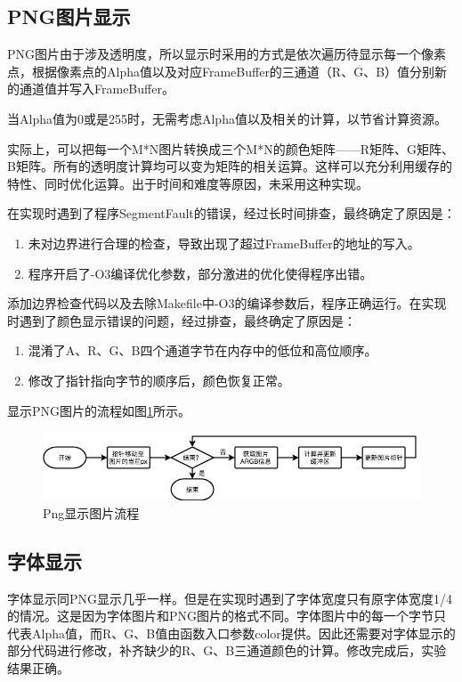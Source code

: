\documentclass{report}
\begin{document}
\subsection{PNG图片显示}
\par PNG图片由于涉及透明度，所以显示时采用的方式是依次遍历待显示每一个像素点，根据像素点的Alpha值以及对应FrameBuffer的三通道（R、G、B）值分别新的通道值并写入FrameBuffer。
\par 当Alpha值为0或是255时，无需考虑Alpha值以及相关的计算，以节省计算资源。
\par 实际上，可以把每一个M*N图片转换成三个M*N的颜色矩阵——R矩阵、G矩阵、B矩阵。所有的透明度计算均可以变为矩阵的相关运算。这样可以充分利用缓存的特性、同时优化运算。出于时间和难度等原因，未采用这种实现。
\par 在实现时遇到了程序SegmentFault的错误，经过长时间排查，最终确定了原因是：

\begin{enumerate}
    \item 未对边界进行合理的检查，导致出现了超过FrameBuffer的地址的写入。
    \item 程序开启了-O3编译优化参数，部分激进的优化使得程序出错。
\end{enumerate}
\par 添加边界检查代码以及去除Makefile中-O3的编译参数后，程序正确运行。在实现时遇到了颜色显示错误的问题，经过排查，最终确定了原因是：

\begin{enumerate}
    \item 混淆了A、R、G、B四个通道字节在内存中的低位和高位顺序。
    \item 修改了指针指向字节的顺序后，颜色恢复正常。
\end{enumerate}
\par 显示PNG图片的流程如图\ref{fig:png}所示。
\begin{figure}[htpb]
    \centering
    \includegraphics[width=0.8\linewidth]{png.png}
    \caption{Png显示图片流程}
    \label{fig:png}
\end{figure}

\subsection{字体显示}
\par 字体显示同PNG显示几乎一样。但是在实现时遇到了字体宽度只有原字体宽度1/4的情况。这是因为字体图片和PNG图片的格式不同。字体图片中的每一个字节只代表Alpha值，而R、G、B值由函数入口参数color提供。因此还需要对字体显示的部分代码进行修改，补齐缺少的R、G、B三通道颜色的计算。修改完成后，实验结果正确。
\end{document}
